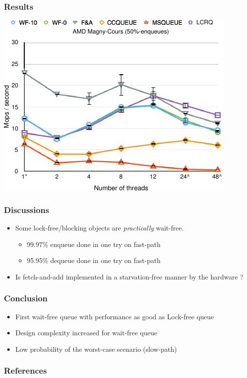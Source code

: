 \documentclass[10pt,a4paper]{beamer}
\begin{document}
\begin{frame}
  \frametitle{Results}
  \center
  \includegraphics[scale=1.3]{../synthese/img/courbe.pdf}
\end{frame}

\begin{frame}
  \frametitle{Discussions}
  \begin{itemize}
  \item[] Some lock-free/blocking objects are \textit{practically} wait-free.
    \medskip
  \begin{itemize}
  \item 99.97\% enqueue done in one try on fast-path \medskip
  \item 95.95\% dequeue done in one try on fast-path
  \end{itemize}
  \vfill
\item[] Is fetch-and-add implemented in a starvation-free manner by the hardware
  ?
  \end{itemize}
\end{frame}

\begin{frame}
  \frametitle{Conclusion}
  \begin{itemize}
  \item First wait-free queue with performance as good as Lock-free queue \vfill
  \item Design complexity increased for wait-free queue \vfill
  \item Low probability of the worst-case scenario (slow-path)
\end{itemize}
\end{frame}

\begin{frame}[allowframebreaks]
 \frametitle{References}
 \nocite{*}
 \printbibliography
\end{frame}
\end{document}
